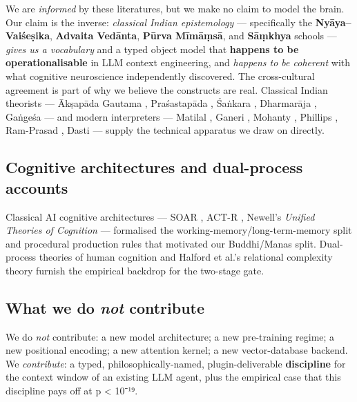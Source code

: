We are \emph{informed} by these literatures, but we make no claim to model the brain. Our claim is the inverse: \emph{classical Indian epistemology} --- specifically the \textbf{Nyāya--Vaiśeṣika}, \textbf{Advaita Vedānta}, \textbf{Pūrva Mīmāṃsā}, and \textbf{Sāṃkhya} schools --- \emph{gives us a vocabulary} and a typed object model that \textbf{happens to be operationalisable} in LLM context engineering, and \emph{happens to be coherent} with what cognitive neuroscience independently discovered. The cross-cultural agreement is part of why we believe the constructs are real. Classical Indian theorists --- Ākṣapāda Gautama \citep{aksapada200nyayasutra}, Praśastapāda \citep{prasastapada6padarthadharma}, Śaṅkara \citep{sankaraupadesha}, Dharmarāja \citep{dharmaraja17vedantaparibhasa}, Gaṅgeśa \citep{gangesa14tattvacintamani} --- and modern interpreters --- Matilal \citep{matilal1986perception, matilal1968navyanyaya}, Ganeri \citep{ganeri2001philosophy, ganeri2017concealed}, Mohanty \citep{mohanty1992reason}, Phillips \citep{phillips2012epistemology, phillips1997classical}, Ram-Prasad \citep{ramprasad2013advaita, ram2007error}, Dasti \citep{dasti2008jayanta} --- supply the technical apparatus we draw on directly.

\subsection{Cognitive architectures and dual-process accounts}\label{cognitive-architectures-and-dual-process-accounts}

Classical AI cognitive architectures --- SOAR \citep{laird1987soar}, ACT-R \citep{anderson1996actr}, Newell's \emph{Unified Theories of Cognition} \citep{newell1990unified} --- formalised the working-memory/long-term-memory split and procedural production rules that motivated our Buddhi/Manas split. Dual-process theories of human cognition \citep{evans2003duality, kahneman2011thinking, sloman1996two, stanovich2000individual, epstein1994integration} and Halford et al.'s relational complexity theory \citep{halford1998processing} furnish the empirical backdrop for the two-stage gate.

\subsection{\texorpdfstring{What we do \emph{not} contribute}{What we do not contribute}}\label{what-we-do-not-contribute}

We do \emph{not} contribute: a new model architecture; a new pre-training regime; a new positional encoding; a new attention kernel; a new vector-database backend. We \emph{contribute}: a typed, philosophically-named, plugin-deliverable \textbf{discipline} for the context window of an existing LLM agent, plus the empirical case that this discipline pays off at p \textless{} 10⁻¹⁹.
